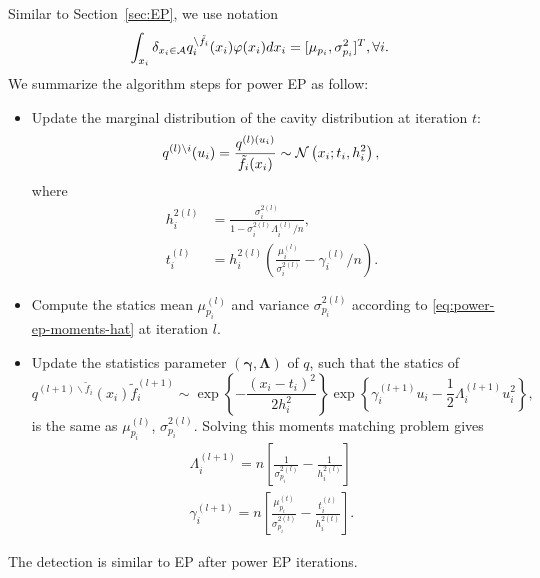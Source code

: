 \documentclass{article}
\begin{document}
Similar to Section~\ref{sec:EP}, we use notation
\begin{equation}\label{eq:power-ep-moments-hat}
  \int_{x_i} \delta_{x_i \in \mathcal{A}} q_i^{\backslash \tilde{f}_i}(x_i) \varphi(x_i) d x_i = [\mu_{p_i}, \sigma_{p_i}^2]^{T}, \forall i.
\end{equation}
We summarize the algorithm steps for power EP as follow:
\begin{itemize}
\item Update the marginal distribution of the cavity distribution at iteration $t$:
  \begin{equation}
    q^{(l)\backslash i}(u_i) = \frac{q^{(l)(u_i)}}{\tilde{f}_i(x_i)} \sim \mathcal{N}\left( x_i; t_i, h_i^2 \right),
  \end{equation}
  where
  \begin{align}
    h_i^{2 (l)} &= \frac{\sigma_i^{2 (l)}}{1-\sigma_i^{2 (l)} \Lambda_i^{(l)}/n}, \\
    t_i^{(l)} &= h_i^{2(l)}\left( \frac{\mu_i^{(l)}}{\sigma_i^{2(l)}} - {\gamma_i^{(l)}}/n \right).
  \end{align}
  
\item Compute the statics mean $\mu_{p_i}^{(l)}$ and variance $\sigma^{2(l)}_{p_i}$  according to \eqref{eq:power-ep-moments-hat} at iteration $l$.
  
\item Update the statistics parameter $\left( \bm{\gamma}, \bm{\Lambda} \right)$ of $q$, such that the statics of
  \begin{equation}
    q^{(l+1)\backslash \tilde{f}_{i}}(x_i) \tilde{f}_{i}^{(l+1)} \sim \exp\left\{ -\frac{(x_i - t_i)^2}{2h_i^2} \right\} \exp\left\{ \gamma_i^{(l+1)}u_i - \frac{1}{2}\Lambda_i^{(l+1)}u_i^2 \right\},
  \end{equation}
  is the same as $\mu_{p_i}^{(l)}$, $\sigma_{p_i}^{2(l)}$. Solving this moments matching problem gives
  \begin{align}
    \Lambda_i^{(l+1)} = n \left[  \frac{1}{\sigma_{p_i}^{2(l)}} - \frac{1}{h_i^{2(l)}} \right]\\
    \gamma_i^{(l+1)} = n \left[ \frac{\mu_{p_i}^{(t)}}{\sigma_{p_i}^{2(t)}} - \frac{t_i^{(t)}}{h_i^{2(t)}} \right].
  \end{align}
\end{itemize}

The detection is similar to EP after power EP iterations.
\end{document}
